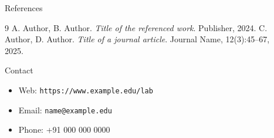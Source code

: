 \documentclass[final]{beamer}
\newlength{\sepwid}
\newlength{\onecolwid}
\begin{document}
\begin{frame}[t]
\begin{columns}[t]
\begin{column}{\onecolwid}
    \begin{block}{References}
      \small
      \begin{thebibliography}{9}
         A. Author, B. Author. \textit{Title of the referenced
          work}. Publisher, 2024.
         C. Author, D. Author. \textit{Title of a journal
          article}. Journal Name, 12(3):45--67, 2025.
      \end{thebibliography}
    \end{block}

    \begin{alertblock}{Contact}
      \begin{itemize}
        \item Web: \texttt{https://www.example.edu/lab}
        \item Email: \texttt{name@example.edu}
        \item Phone: +91 000 000 0000
      \end{itemize}
    \end{alertblock}

  \end{column}

  \begin{column}{\sepwid}\end{column}

\end{columns}
\end{frame}
\end{document}
